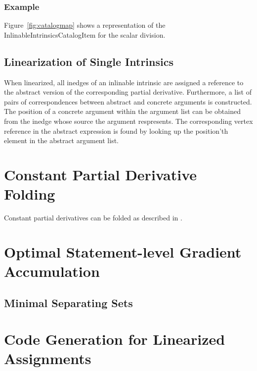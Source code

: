 \documentclass{book}
\newcommand{\fig}[1]{Figure~#1}
\begin{document}
\subsubsection{Example}

\fig{\ref{fig:catalogmap}} shows a representation of the
InlinableIntrinsicsCatalogItem for the scalar division. 

 

\subsection{Linearization of Single Intrinsics}
\label{ssec:lin_intr}

When linearized, all inedges of an inlinable intrinsic are assigned
a reference to the abstract version of the corresponding
partial derivative. Furthermore, a list of pairs of correspondences
between abstract and concrete arguments is constructed. The position
of a concrete argument within the argument list can be obtained from
the inedge whose source the argument respresents. The corresponding
vertex reference in the abstract expression is found by looking up
the position'th element in the abstract argument list.

\section{Constant Partial Derivative Folding}
\label{sec:const_fold}

Constant partial derivatives can be folded as described in 
\cite{Nau03OptStatGrad}.

\section{Optimal Statement-level Gradient Accumulation}

\subsection{Minimal Separating Sets}

\section{Code Generation for Linearized Assignments}
\label{sec:code_gen_lin_assgn}
\end{document}
